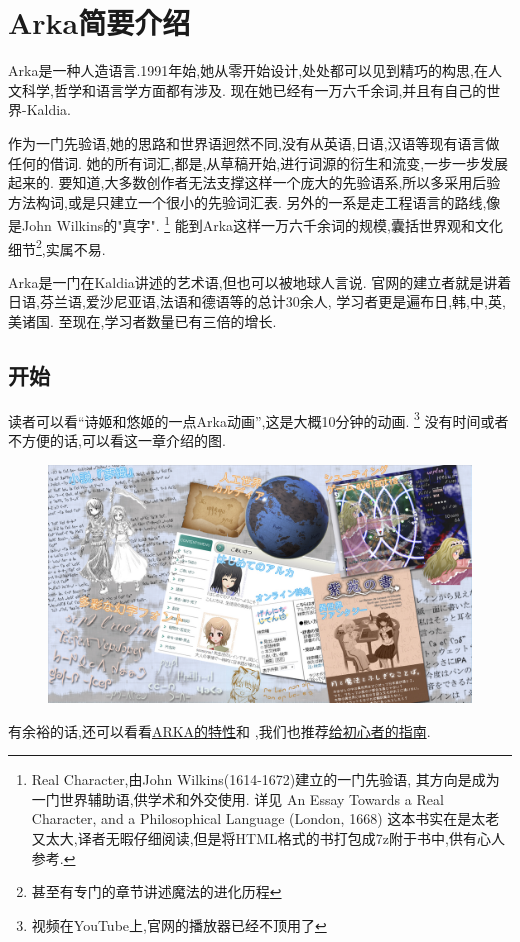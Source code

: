 \chapter{Arka简要介绍}
Arka是一种人造语言.1991年始,她从零开始设计,处处都可以见到精巧的构思,在人文科学,哲学和语言学方面都有涉及.
现在她已经有一万六千余词,并且有自己的世界-Kaldia.

作为一门先验语,她的思路和世界语迥然不同,没有从英语,日语,汉语等现有语言做任何的借词.
她的所有词汇,都是,从草稿开始,进行词源的衍生和流变,一步一步发展起来的.
要知道,大多数创作者无法支撑这样一个庞大的先验语系,所以多采用后验方法构词,或是只建立一个很小的先验词汇表.
另外的一系是走工程语言的路线,像是John Wilkins的"真字".
\footnote{Real Character,由John Wilkins(1614-1672)建立的一门先验语,
其方向是成为一门世界辅助语,供学术和外交使用.
详见
{An Essay Towards a Real Character, and a Philosophical Language (London, 1668)}
这本书实在是太老又太大,译者无暇仔细阅读,但是将HTML格式的书打包成7z附于书中,供有心人参考.
}
能到Arka这样一万六千余词的规模,囊括世界观和文化细节\footnote{甚至有专门的章节讲述魔法的进化历程},实属不易.

Arka是一门在Kaldia讲述的艺术语,但也可以被地球人言说.
官网的建立者就是讲着日语,芬兰语,爱沙尼亚语,法语和德语等的总计30余人,
学习者更是遍布日,韩,中,英,美诸国.
至现在,学习者数量已有三倍的增长.


\section{开始}
读者可以看``诗姬和悠姬的一点Arka动画'',这是大概10分钟的动画.
\footnote{视频在YouTube上,官网的播放器已经不顶用了}
没有时间或者不方便的话,可以看这一章介绍的图.
\begin{figure}[H]
\includegraphics[width=1\textwidth]{ARKA/leis.jpg}
\end{figure}
有余裕的话,还可以看看\href{http://www44.atwiki.jp/conlang_arka/pages/1.html}{ARKA的特性}和
,我们也推荐\href{http://conlinguistics.org/arka/e_study_kit.html}{给初心者的指南}.

